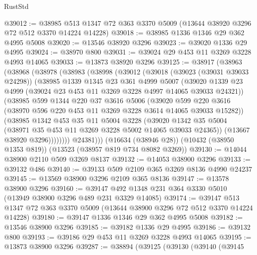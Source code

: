 \begin{lexlean}{RustStd}
\begin{coremodule}
@39012 := @38985 @513 @1347 @72 @363 @3370 @5009 (@13644 @38920 @3296 @72 @512 @3370 @14224 @14228)
@39018 := @38985 @1336 @1346 @29 @362 @4995 @5008
@39020 := @13546 @38920 @3296
@39023 := @39020 @1336 @29 @4995
@39024 := @38970 @800
@39031 := @39024 @29 @453 @11 @3269 @3228 @4993 @14065
@39033 := @13873 @38920 @3296
@39125 := @38917
    (@38963
      (@38968
        (@38978
          (@38983
            (@38998
              (@39012
                (@39018
                  (@39023 (@39031 @39033 @24298))
                  (@38985
                    @1339
                    @1345
                    @23
                    @361
                    @4999
                    @5007
                    (@39020
                      @1339
                      @23
                      @4999
                      (@39024 @23 @453 @11 @3269 @3228 @4997 @14065 @39033 @24321))
                    (@38985
                      @599
                      @1344
                      @220
                      @37
                      @3616
                      @5006
                      (@39020
                        @599
                        @220
                        @3616
                        (@38970 @596 @220 @453 @11 @3269 @3228 @3614 @14065 @39033 @15282))
                      (@38985
                        @1342
                        @453
                        @35
                        @11
                        @5004
                        @3228
                        (@39020
                          @1342
                          @35
                          @5004
                          (@38971 @35 @453 @11 @3269 @3228 @5002 @14065 @39033 @24365))
                        (@13667 @38920 @3296))))))))
          @24381)))
    (@16634 (@38946 @28))
    (@10432 (@38950 @1353 @819))
    (@13523 (@38957 @819 @734 @8082 @3269))
@39130 := @14044 @38900 @2110 @509 @3269 @8137
@39132 := @14053 @38900 @3296
@39133 := @39132 @486
@39140 := @39133 @509 @2109 @365 @3269 @8136 @4990 @24237
@39145 := @13569 @38900 @3296 @2109 @365 @8136
@39147 := @13578 @38900 @3296
@39160 := @39147 @492 @1348 @231 @364 @3330 @5010 (@13949 @38900 @3296 @489 @231 @3329 @14085)
@39174 := @39147 @513 @1347 @72 @363 @3370 @5009 (@13644 @38900 @3296 @72 @512 @3370 @14224 @14228)
@39180 := @39147 @1336 @1346 @29 @362 @4995 @5008
@39182 := @13546 @38900 @3296
@39185 := @39182 @1336 @29 @4995
@39186 := @39132 @800
@39193 := @39186 @29 @453 @11 @3269 @3228 @4993 @14065
@39195 := @13873 @38900 @3296
@39287 := @38894
    (@39125
      (@39130
        (@39140
          (@39145

\end{coremodule}
\end{lexlean}
